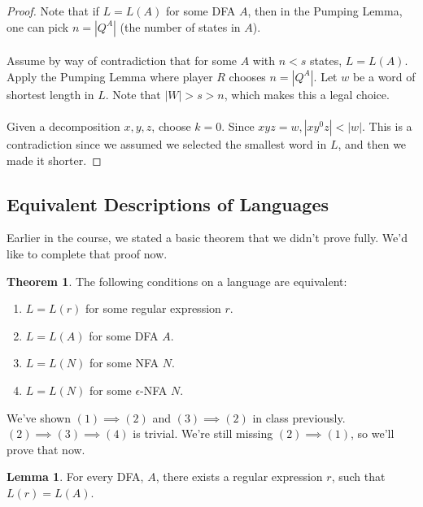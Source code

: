 \documentclass[]{article}
\theoremstyle{definition}
\newtheorem*{theorem}{Theorem}
\newtheorem*{lemma}{Lemma}
\begin{document}
        \begin{proof}
          Note that if $L = L(A)$ for some DFA $A$, then in the Pumping Lemma, one can pick $n = |Q^A|$ (the number of states in $A$).
          \\ \\
          Assume by way of contradiction that for some $A$ with $n < s$ states, $L = L(A)$. Apply the Pumping Lemma where player $R$ chooses $n = |Q^A|$. Let $w$ be a word of shortest length in $L$. Note that $|W| > s > n$, which makes this a legal choice.
          \\ \\
          Given a decomposition $x, y, z$, choose $k = 0$. Since $xyz = w, |xy^0z| < |w|$. This is a contradiction since we assumed we selected the smallest word in $L$, and then we made it shorter.
        \end{proof}

      \subsection{Equivalent Descriptions of Languages}
        Earlier in the course, we stated a basic theorem that we didn't prove fully. We'd like to complete that proof now.

        \begin{theorem}
          The following conditions on a language are equivalent:
          \begin{enumerate}
            \item $L = L(r)$ for some regular expression $r$.
            \item $L = L(A)$ for some DFA $A$.
            \item $L = L(N)$ for some NFA $N$.
            \item $L = L(N)$ for some $\epsilon$-NFA $N$.
          \end{enumerate}
        \end{theorem}

        We've shown $(1) \implies (2)$ and $(3) \implies (2)$ in class previously. $(2) \implies (3) \implies (4)$ is trivial. We're still missing $(2) \implies (1)$, so we'll prove that now.

        \begin{lemma}
          For every DFA, $A$, there exists a regular expression $r$, such that $L(r) = L(A)$.
        \end{lemma}
\end{document}
